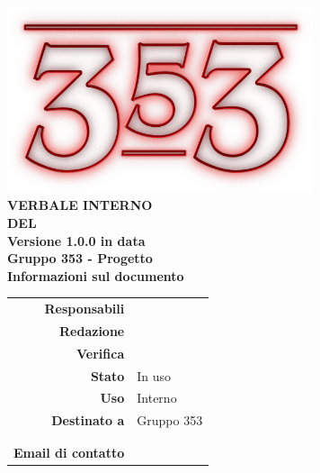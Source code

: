 \documentclass[openany, a4paper, 12pt]{report}
\begin{document}
\begin{titlepage}
	\centering
	\vfill
	{
		\bfseries
		\vskip2cm
		\includegraphics[width=9cm]{../../common/images/logo.png} \\
		\vfill
		\Huge{VERBALE INTERNO\\DEL {}}\\
		\vfill
		\Large Versione 1.0.0 in data \\
		\large Gruppo 353 - Progetto \progetto \\
		\vfill
		\normalsize Informazioni sul documento\\
		\begin{table}[htbp]
			\centering
			\renewcommand\arraystretch{1.2}
			\begin{tabular}{r|l}
				\hline
				\textbf{Responsabili}	& \Gianluca\\
				
				\textbf{Redazione} 		& \Valentina \\
				\textbf{Verifica} 		& \Davide \\	
				
				\textbf{Stato} 			& In uso\\
				\textbf{Uso}			& Interno\\
				\textbf{Destinato a}   	& Gruppo 353\\
										& \Vardanega\\
										& \Cardin\\
				
				\textbf{Email di contatto}	& \mailgroup
			\end{tabular}
		\end{table}
		\vfill 
	}    
\end{titlepage}
\newpage
{}

 
\end{document}
